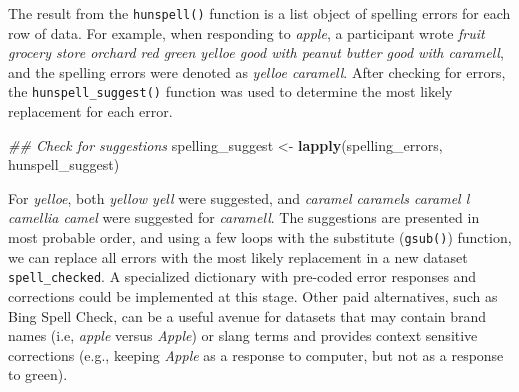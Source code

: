 \documentclass[man]{apa6}
\newenvironment{Shaded}{\begin{snugshade}}{\end{snugshade}}
\newcommand{\CommentTok}[1]{\textcolor[rgb]{0.56,0.35,0.01}{\textit{#1}}}
\newcommand{\ControlFlowTok}[1]{\textcolor[rgb]{0.13,0.29,0.53}{\textbf{#1}}}
\newcommand{\DecValTok}[1]{\textcolor[rgb]{0.00,0.00,0.81}{#1}}
\newcommand{\KeywordTok}[1]{\textcolor[rgb]{0.13,0.29,0.53}{\textbf{#1}}}
\newcommand{\NormalTok}[1]{#1}
\newcommand{\OperatorTok}[1]{\textcolor[rgb]{0.81,0.36,0.00}{\textbf{#1}}}
\newcommand{\StringTok}[1]{\textcolor[rgb]{0.31,0.60,0.02}{#1}}
\begin{document}
\normalsize

The result from the \texttt{hunspell()} function is a list object of spelling errors for each row of data. For example, when responding to \emph{apple}, a participant wrote \emph{fruit grocery store orchard red green yelloe good with peanut butter good with caramell}, and the spelling errors were denoted as \emph{yelloe caramell}. After checking for errors, the \texttt{hunspell\_suggest()} function was used to determine the most likely replacement for each error.

\scriptsize

\begin{Shaded}
\begin{Highlighting}[]
\CommentTok{## Check for suggestions}
\NormalTok{spelling_suggest <-}\StringTok{ }\KeywordTok{lapply}\NormalTok{(spelling_errors, hunspell_suggest)}
\end{Highlighting}
\end{Shaded}

\normalsize

For \emph{yelloe}, both \emph{yellow yell} were suggested, and \emph{caramel caramels caramel l camellia camel} were suggested for \emph{caramell}. The suggestions are presented in most probable order, and using a few loops with the substitute (\texttt{gsub()}) function, we can replace all errors with the most likely replacement in a new dataset \texttt{spell\_checked}. A specialized dictionary with pre-coded error responses and corrections could be implemented at this stage. Other paid alternatives, such as Bing Spell Check, can be a useful avenue for datasets that may contain brand names (i.e, \emph{apple} versus \emph{Apple}) or slang terms and provides context sensitive corrections (e.g., keeping \emph{Apple} as a response to computer, but not as a response to green).

\scriptsize

\begin{Shaded}
\end{Shaded}
\end{document}
